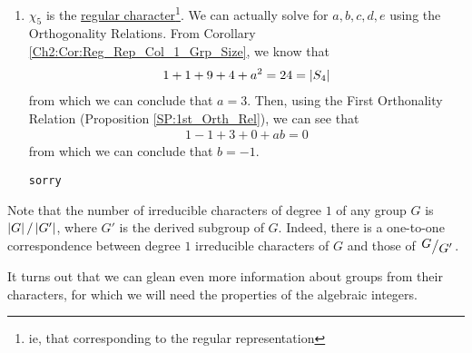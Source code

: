\begin{example}[$S_4$]
\begin{enumerate}
        \item $\chi_5$ is the \underline{regular character}\footnote{ie, that corresponding to the regular representation}. We can actually solve for $a,b,c,d,e$ using the Orthogonality Relations. From Corollary \ref{Ch2:Cor:Reg_Rep_Col_1_Grp_Size}, we know that
        \begin{align*}
            1 + 1 + 9 + 4 + a^2 = 24 = \left\lvert S_4 \right\rvert
        \end{align*}
        from which we can conclude that $a = 3$. Then, using the First Orthonality Relation (Proposition \ref{SP:1st_Orth_Rel}), we can see that
        \begin{align*}
            1 - 1 + 3 + 0 + ab = 0
        \end{align*}
        from which we can conclude that $b = -1$.

        \verb|sorry|
    \end{enumerate}
\end{example}

Note that the number of irreducible characters of degree $1$ of any group $G$ is $\left\lvert G \right\rvert / \left\lvert G' \right\rvert$, where $G'$ is the derived subgroup of $G$. Indeed, there is a one-to-one correspondence between degree $1$ irreducible characters of $G$ and those of $\quotient{G}{G'}$.

It turns out that we can glean even more information about groups from their characters, for which we will need the properties of the algebraic integers.